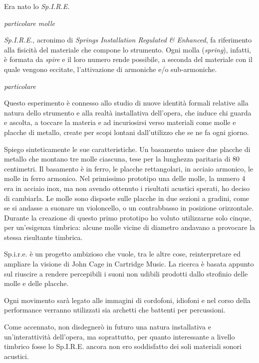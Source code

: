Era nato lo \textit{Sp.I.R.E.}
\\
\begin{floatingfigure}{10cm}
\mbox{}
\small{\caption{\textit{particolare molle}}}
\end{floatingfigure}
\textit{Sp.I.R.E.}, acronimo di \textit{Springs Installation Regulated \& Enhanced}, fa riferimento alla fisicità del materiale che compone lo strumento. Ogni molla (\textit{spring}), infatti, è formata da \textit{spire} e il loro numero rende possibile, a seconda del materiale con il quale vengono eccitate, l'attivazione di armoniche e/o sub-armoniche.
\begin{floatingfigure}{10cm}
\mbox{}
\small{\caption{\textit{particolare}}}
\end{floatingfigure}
Questo esperimento è connesso allo studio di nuove identità formali relative alla natura dello strumento e alla realtà installativa dell'opera, che induce chi guarda e ascolta, a toccare la materia e ad incuriosirsi verso materiali come molle e placche di metallo, create per scopi lontani dall'utilizzo che se ne fa ogni giorno.

Spiego sinteticamente le sue caratteristiche. Un basamento unisce due placche di metallo che montano tre molle ciascuna, tese per la lunghezza paritaria di 80 centimetri. Il basamento è in ferro, le placche rettangolari, in acciaio armonico, le molle in ferro armonico. Nel primissimo prototipo una delle molle, la numero 4 era in acciaio inox, ma non avendo ottenuto i risultati acustici sperati, ho deciso di cambiarla. Le molle sono disposte sulle placche in due sezioni a gradini, come se si andasse a suonare un violoncello, o un contrabbasso in posizione orizzontale. Durante la creazione di questo primo prototipo ho voluto utilizzarne solo cinque, per un'esigenza timbrica: alcune molle vicine di diametro andavano a provocare la stessa risultante timbrica. 

Sp.i.r.e. è un progetto ambizioso che vuole, tra le altre cose, reinterpretare ed ampliare la visione di John Cage in Cartridge Music. La ricerca è basata appunto sul riuscire a rendere percepibili i suoni non udibili prodotti dallo strofinio delle molle e delle placche.

Ogni movimento sarà legato alle immagini di cordofoni, idiofoni e nel corso della performance verranno utilizzati sia archetti che battenti per percussioni.   

Come accennato, non disdegnerò in futuro una natura installativa e un'interattività dell'opera, ma soprattutto, per quanto interessante a livello timbrico fosse lo Sp.I.R.E. ancora non ero soddisfatto dei soli materiali sonori acustici.

